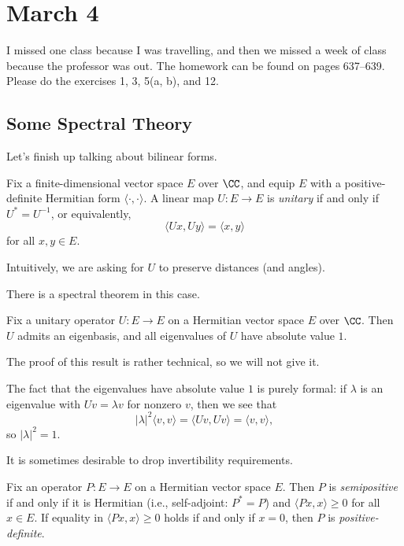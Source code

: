 \documentclass[../notes.tex]{subfiles}
\begin{document}
\section{March 4}

I missed one class because I was travelling, and then we missed a week of class because the professor was out. The homework can be found on pages 637--639. Please do the exercises 1, 3, 5(a, b), and 12.

\subsection{Some Spectral Theory}
Let's finish up talking about bilinear forms.
\begin{definition}[unitary]
	Fix a finite-dimensional vector space $E$ over $\CC$, and equip $E$ with a positive-definite Hermitian form $\langle\cdot,\cdot\rangle$. A linear map $U\colon E\to E$ is \textit{unitary} if and only if $U^*=U^{-1}$, or equivalently,
	\[\langle Ux,Uy\rangle=\langle x,y\rangle\]
	for all $x,y\in E$.
\end{definition}
\begin{remark}
	Intuitively, we are asking for $U$ to preserve distances (and angles).
\end{remark}
There is a spectral theorem in this case.
\begin{theorem}
	Fix a unitary operator $U\colon E\to E$ on a Hermitian vector space $E$ over $\CC$. Then $U$ admits an eigenbasis, and all eigenvalues of $U$ have absolute value $1$.
\end{theorem}
The proof of this result is rather technical, so we will not give it.
\begin{remark}
	The fact that the eigenvalues have absolute value $1$ is purely formal: if $\lambda$ is an eigenvalue with $Uv=\lambda v$ for nonzero $v$, then we see that
	\[\left|\lambda\right|^2\langle v,v\rangle=\langle Uv,Uv\rangle=\langle v,v\rangle,\]
	so $\left|\lambda\right|^2=1$.
\end{remark}
It is sometimes desirable to drop invertibility requirements.
\begin{definition}[semipositive]
	Fix an operator $P\colon E\to E$ on a Hermitian vector space $E$. Then $P$ is \textit{semipositive} if and only if it is Hermitian (i.e., self-adjoint: $P^*=P$) and $\langle Px,x\rangle\ge0$ for all $x\in E$. If equality in $\langle Px,x\rangle\ge0$ holds if and only if $x=0$, then $P$ is \textit{positive-definite}.
\end{definition}
\end{document}

